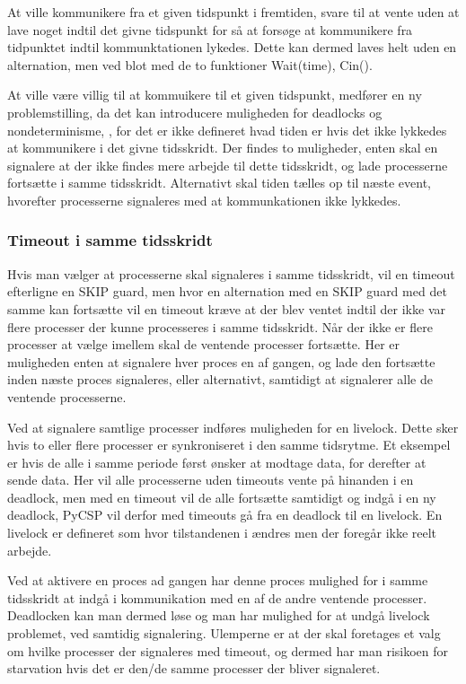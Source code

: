 At ville kommunikere fra et given tidspunkt i fremtiden, svare til at   
vente uden at lave noget indtil det givne tidspunkt for så at forsøge 
at kommunikere fra tidpunktet indtil kommunktationen lykedes. Dette     
kan dermed laves helt uden en alternation, men ved blot med de to       
funktioner Wait(time), Cin().                                           

At ville være villig til at kommuikere til et given tidspunkt,         
medfører en ny problemstilling, da det kan introducere muligheden      
for deadlocks og nondeterminisme, , for det     
er ikke defineret hvad tiden er hvis det ikke lykkedes at kommunikere   
i det givne tidsskridt. Der findes to muligheder, enten skal \sched     
en signalere at der ikke findes mere arbejde til dette tidsskridt, og   
lade processerne fortsætte i samme tidsskridt. Alternativt skal tiden  
tælles op til næste event, hvorefter processerne signaleres med at    
kommunkationen ikke lykkedes.                                           

\subsubsection{Timeout i samme tidsskridt} Hvis man vælger at
processerne skal signaleres i samme tidsskridt, vil en timeout
efterligne en SKIP guard, men hvor en alternation med en SKIP guard med
det samme kan fortsætte vil en timeout kræve at der blev ventet indtil
der ikke var flere processer der kunne processeres i samme tidsskridt.
Når der ikke er flere processer at vælge imellem skal de ventende
processer fortsætte. Her er muligheden enten at signalere hver proces
en af gangen, og lade den fortsætte inden næste proces signaleres,
eller alternativt, samtidigt at signalerer alle de ventende processerne.

Ved at signalere samtlige processer indføres muligheden for en
livelock. Dette sker hvis to eller flere processer er synkroniseret i
den samme tidsrytme. Et eksempel er hvis de alle i samme periode først
ønsker at modtage data, for derefter at sende data. Her vil alle
processerne uden timeouts vente på hinanden i en deadlock, men med en
timeout vil de alle fortsætte samtidigt og indgå i en ny deadlock,
PyCSP vil derfor med timeouts gå fra en deadlock til en livelock. En
livelock er defineret som hvor tilstandenen i ændres men der foregår
ikke reelt arbejde.

Ved at aktivere en proces ad gangen har denne proces mulighed for i
samme tidsskridt at indgå i kommunikation med en af de andre ventende
processer. Deadlocken kan man dermed løse og man har mulighed for at
undgå livelock problemet, ved samtidig signalering. Ulemperne er at der
skal foretages et valg om hvilke processer der signaleres med timeout,
og dermed har man risikoen for starvation hvis det er
den/de samme processer der bliver signaleret.

